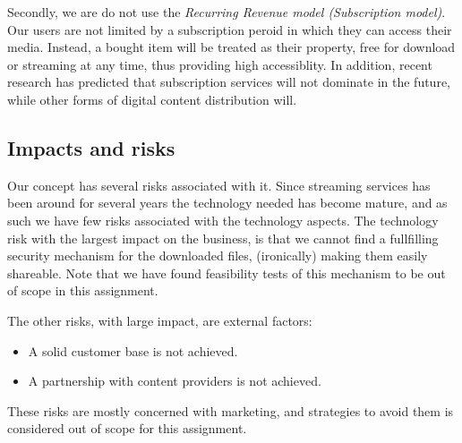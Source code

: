 Secondly, we are do not use the \emph{Recurring Revenue model (Subscription model)}\cite{businessmodel}. Our users are not limited by a subscription peroid in which they can access their media. Instead, a bought item will be treated as their property, free for download or streaming at any time, thus providing high accessiblity. In addition, recent research\cite{ott} has predicted that subscription services will not dominate in the future, while other forms of digital content distribution will.

\subsection{Impacts and risks}
Our concept has several risks associated with it. Since streaming services has been around for several years the technology needed has become mature, and as such we have few risks associated with the technology aspects. The technology risk with the largest impact on the business, is that we cannot find a fullfilling security mechanism for the downloaded files, (ironically) making them easily shareable. Note that we have found feasibility tests of this mechanism to be out of scope in this assignment.

The other risks, with large impact, are external factors:
\begin{itemize}
\item A solid customer base is not achieved.
\item A partnership with content providers is not achieved.
\end{itemize}

These risks are mostly concerned with marketing, and strategies to avoid them is considered out of scope for this assignment.
